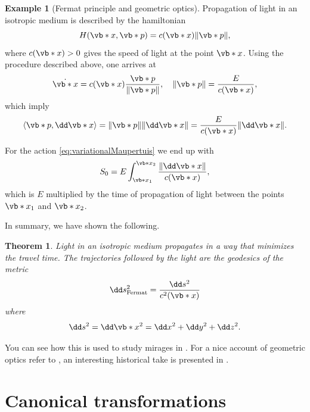 \documentclass[english,fontsize=11pt,paper=b5]{scrbook}
\newtheorem{theorem}{Theorem}[chapter]
\theoremstyle{definition}
\newtheorem{example}{Example}[chapter]
\begin{document}
    \begin{example}[Fermat principle and geometric optics]
      Propagation of light in an isotropic medium is described by the hamiltonian
      \begin{equation}
        H(\vb*{x}, \vb*{p}) = c(\vb*{x}) \|\vb*{p}\|,
      \end{equation}
      where $c(\vb*{x}) > 0$ gives the speed of light at the point $\vb*{x}$.
      Using the procedure described above, one arrives at
      \begin{equation}
        \dot{\vb*{x}} = c(\vb*{x})\frac{\vb*{p}}{\|\vb*{p}\|}, \quad
        \|\vb*{p}\| = \frac{E}{c(\vb*{x})},
      \end{equation}
      which imply
      \begin{equation}
        \langle\vb*{p}, \dd\vb*{x}\rangle = \|\vb*{p}\|\|\dd \vb*{x}\| = \frac{E}{c(\vb*{x})}\|\dd\vb*{x}\|.
      \end{equation}

      For the action \eqref{eq:variationalMaupertuis} we end up with
      \begin{equation}
        S_0 = E \int_{\vb*{x}_1}^{\vb*{x}_2} \frac{\|\dd\vb*{x}\|}{c(\vb*{x})},
      \end{equation}
      which is $E$ multiplied by the time of propagation of light between the points $\vb*{x}_1$ and $\vb*{x}_2$.

      In summary, we have shown the following.
      \begin{theorem}
        Light in an isotropic medium propagates in a way that minimizes the travel time.
        The trajectories followed by the light are the geodesics of the metric
        \begin{equation}
          \dd s^2_{\mathrm{Fermat}} = \frac{\dd s^2}{c^2(\vb*{x})}
        \end{equation}
        where
        \begin{equation}
          \dd s^2 = \dd \vb*{x}^2 = \dd x^2 + \dd y^2 + \dd z^2.
        \end{equation}
      \end{theorem}

      You can see how this is used to study mirages in \cite[Example 8.34]{book:knauf}.
      For a nice account of geometric optics refer to \cite[Chapter 8.7]{book:knauf}, an interesting historical take is presented in \cite{book:broer}.
    \end{example}

    \section{Canonical transformations}
\end{document}
